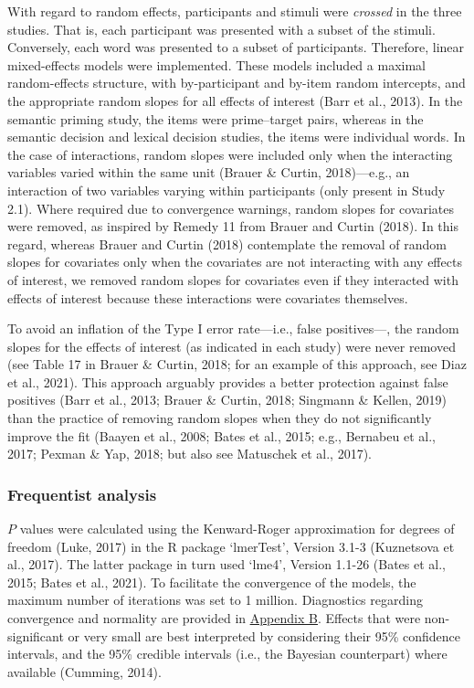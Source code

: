 \documentclass[
  12pt,
  man,floatsintext]{apa7}
\begin{document}
With regard to random effects, participants and stimuli were \emph{crossed} in the three studies. That is, each participant was presented with a subset of the stimuli. Conversely, each word was presented to a subset of participants. Therefore, linear mixed-effects models were implemented. These models included a maximal random-effects structure, with by-participant and by-item random intercepts, and the appropriate random slopes for all effects of interest (Barr et al., 2013). In the semantic priming study, the items were prime--target pairs, whereas in the semantic decision and lexical decision studies, the items were individual words. In the case of interactions, random slopes were included only when the interacting variables varied within the same unit (Brauer \& Curtin, 2018)---e.g., an interaction of two variables varying within participants (only present in Study 2.1). Where required due to convergence warnings, random slopes for covariates were removed, as inspired by Remedy 11 from Brauer and Curtin (2018). In this regard, whereas Brauer and Curtin (2018) contemplate the removal of random slopes for covariates only when the covariates are not interacting with any effects of interest, we removed random slopes for covariates even if they interacted with effects of interest because these interactions were covariates themselves.

To avoid an inflation of the Type I error rate---i.e., false positives---, the random slopes for the effects of interest (as indicated in each study) were never removed (see Table 17 in Brauer \& Curtin, 2018; for an example of this approach, see Diaz et al., 2021). This approach arguably provides a better protection against false positives (Barr et al., 2013; Brauer \& Curtin, 2018; Singmann \& Kellen, 2019) than the practice of removing random slopes when they do not significantly improve the fit (Baayen et al., 2008; Bates et al., 2015; e.g., Bernabeu et al., 2017; Pexman \& Yap, 2018; but also see Matuschek et al., 2017).

\hypertarget{frequentist-analysis}{%
\subsubsection{Frequentist analysis}\label{frequentist-analysis}}

\(P\) values were calculated using the Kenward-Roger approximation for degrees of freedom (Luke, 2017) in the R package `lmerTest', Version 3.1-3 (Kuznetsova et al., 2017). The latter package in turn used `lme4', Version 1.1-26 (Bates et al., 2015; Bates et al., 2021). To facilitate the convergence of the models, the maximum number of iterations was set to 1 million. Diagnostics regarding convergence and normality are provided in \protect\hyperlink{appendix-B-frequentist-analysis-diagnostics}{\underline{Appendix B}}. Effects that were non-significant or very small are best interpreted by considering their 95\% confidence intervals, and the 95\% credible intervals (i.e., the Bayesian counterpart) where available (Cumming, 2014).
\end{document}
